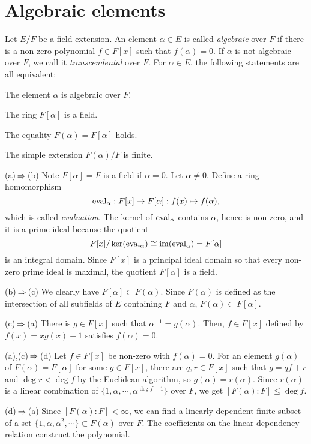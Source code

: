 \documentclass{../note}
\begin{document}
\section{Algebraic elements}
\begin{prb}
Let $E/F$ be a field extension.
An element $\alpha\in E$ is called \emph{algebraic} over $F$ if there is a non-zero polynomial $f\in F[x]$ such that $f(\alpha)=0$.
If $\alpha$ is not algebraic over $F$, we call it \emph{transcendental} over $F$.
For $\alpha\in E$, the following statements are all equivalent:
\begin{parts}
\item The element $\alpha$ is algebraic over $F$.
\item The ring $F[\alpha]$ is a field.
\item The equality $F(\alpha)=F[\alpha]$ holds.
\item The simple extension $F(\alpha)/F$ is finite.
\end{parts}
\end{prb}
\begin{pf}
(a)$\impl$(b)
Note $F[\alpha]=F$ is a field if $\alpha=0$.
Let $\alpha\ne0$.
Define a ring homomorphism
\[\operatorname{eval}_\alpha:F[x]\to F[\alpha]:f(x)\mapsto f(\alpha),\]
which is called \emph{evaluation}.
The kernel of $\operatorname{eval}_\alpha$ contains $\alpha$, hence is non-zero, and it is a prime ideal because the quotient
\[F[x]/\ker(\operatorname{eval}_\alpha)\cong\operatorname{im}(\operatorname{eval}_\alpha)=F[\alpha]\]
is an integral domain.
Since $F[x]$ is a principal ideal domain so that every non-zero prime ideal is maximal, the quotient $F[\alpha]$ is a field.

(b)$\impl$(c)
We clearly have $F[\alpha]\subset F(\alpha)$.
Since $F(\alpha)$ is defined as the intersection of all subfields of $E$ containing $F$ and $\alpha$, $F(\alpha)\subset F[\alpha]$.

(c)$\impl$(a)
There is $g\in F[x]$ such that $\alpha^{-1}=g(\alpha)$.
Then, $f\in F[x]$ defined by $f(x)=xg(x)-1$ satisfies $f(\alpha)=0$.

(a),(c)$\impl$(d)
Let $f\in F[x]$ be non-zero with $f(\alpha)=0$.
For an element $g(\alpha)$ of $F(\alpha)=F[\alpha]$ for some $g\in F[x]$, there are $q,r\in F[x]$ such that $g=qf+r$ and $\deg r<\deg f$ by the Euclidean algorithm, so $g(\alpha)=r(\alpha)$.
Since $r(\alpha)$ is a linear combination of $\{1,\alpha,\cdots,\alpha^{\deg f-1}\}$ over $F$, we get $[F(\alpha):F]\le\deg f$.

(d)$\impl$(a)
Since $[F(\alpha):F]<\infty$, we can find a linearly dependent finite subset of a set $\{1,\alpha,\alpha^2,\cdots\}\subset F(\alpha)$ over $F$.
The coefficients on the linear dependency relation construct the polynomial.
\end{pf}
\end{document}
